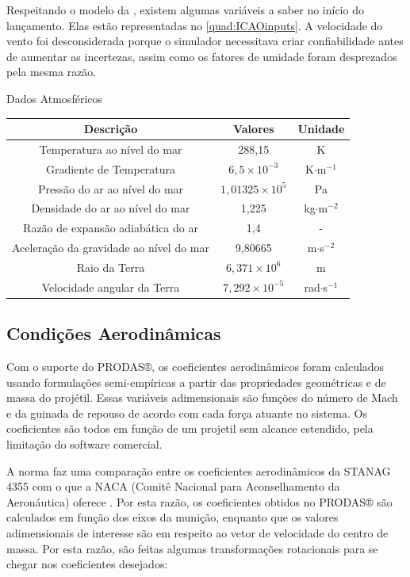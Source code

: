 Respeitando o modelo da , existem algumas variáveis a saber no início do lançamento. Elas estão representadas no \autoref{quad:ICAOinputs}. A velocidade do vento foi desconsiderada porque o simulador necessitava criar confiabilidade antes de aumentar as incertezas, assim como os fatores de umidade foram desprezados pela mesma razão.

\begin{quadro}[htb]
\caption{\label{quad:ICAOinputs}Dados Atmosféricos}
\begin{tabular}{|c|c|c|}
\hline
\textbf{Descrição} & \textbf{Valores} & \textbf{Unidade}\\
\hline
Temperatura ao nível do mar & 288,15 & K\\
\hline
Gradiente de Temperatura & $6,5 \times 10^{-3}$ & K$\cdot$m$^{-1}$\\
\hline
Pressão do ar ao nível do mar & $1,01325 \times 10^{5}$ & Pa\\
\hline
Densidade do ar ao nível do mar & 1,225 & kg$\cdot$m$^{-2}$ \\
\hline
Razão de expansão adiabática do ar & 1,4 & - \\
\hline
Aceleração da gravidade ao nível do mar & 9,80665 & m$\cdot$s$^{-2}$\\
\hline
Raio da Terra & $6,371 \times 10^{6}$ & m\\
\hline
Velocidade angular da Terra & $7,292 \times 10^{-5}$ & rad$\cdot$s$^{-1}$ \\
\hline
\end{tabular}
\end{quadro}

\subsection{Condições Aerodinâmicas}\label{subsec:condicoes-aerodinamicas}

Com o suporte do PRODAS®, os coeficientes aerodinâmicos foram calculados usando formulações semi-empíricas a partir das propriedades geométricas e de massa do projétil. Essas variáveis adimensionais são funções do número de Mach e da guinada de repouso de acordo com cada força atuante no sistema. Os coeficientes são todos em função de um projetil sem alcance estendido, pela limitação do software comercial. 

A norma faz uma comparação entre os coeficientes aerodinâmicos da STANAG 4355 com o que a NACA (Comitê Nacional para Aconselhamento da Aeronáutica) oferece \cite{stanag4355}. Por esta razão, os coeficientes obtidos no PRODAS® são calculados em função dos eixos da munição, enquanto que os valores adimensionais de interesse são em respeito ao vetor de velocidade do centro de massa. Por esta razão, são feitas algumas transformações rotacionais para se chegar nos coeficientes desejados:


